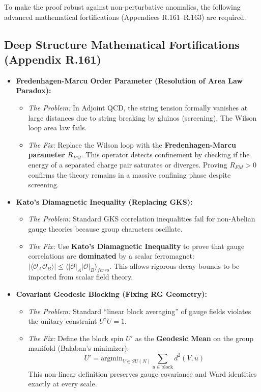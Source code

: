 To make the proof robust against non-perturbative anomalies, the following advanced mathematical fortifications (Appendices R.161--R.163) are required.

\subsection{Deep Structure Mathematical Fortifications (Appendix R.161)}

\begin{itemize}
    \item \textbf{Fredenhagen-Marcu Order Parameter (Resolution of Area Law Paradox):}
    \begin{itemize}
        \item \textit{The Problem:} In Adjoint QCD, the string tension formally vanishes at large distances due to string breaking by gluinos (screening). The Wilson loop area law fails.
        \item \textit{The Fix:} Replace the Wilson loop with the \textbf{Fredenhagen-Marcu parameter} $R_{FM}$. This operator detects confinement by checking if the energy of a separated charge pair saturates or diverges. Proving $R_{FM} > 0$ confirms the theory remains in a massive confining phase despite screening.
    \end{itemize}

    \item \textbf{Kato's Diamagnetic Inequality (Replacing GKS):}
    \begin{itemize}
        \item \textit{The Problem:} Standard GKS correlation inequalities fail for non-Abelian gauge theories because group characters oscillate.
        \item \textit{The Fix:} Use \textbf{Kato's Diamagnetic Inequality} to prove that gauge correlations are \textbf{dominated} by a scalar ferromagnet: $|\langle \mathcal{O}_A \mathcal{O}_B \rangle| \le \langle |\mathcal{O}|_A |\mathcal{O}|_B \rangle_{ferro}$. This allows rigorous decay bounds to be imported from scalar field theory.
    \end{itemize}

    \item \textbf{Covariant Geodesic Blocking (Fixing RG Geometry):}
    \begin{itemize}
        \item \textit{The Problem:} Standard ``linear block averaging'' of gauge fields violates the unitary constraint $U^\dagger U = 1$.
        \item \textit{The Fix:} Define the block spin $U'$ as the \textbf{Geodesic Mean} on the group manifold (Balaban's minimizer):
        \[ U' = \text{argmin}_{V \in SU(N)} \sum_{u \in \text{block}} d^2(V, u) \]
        This non-linear definition preserves gauge covariance and Ward identities exactly at every scale.
    \end{itemize}
\end{itemize}

